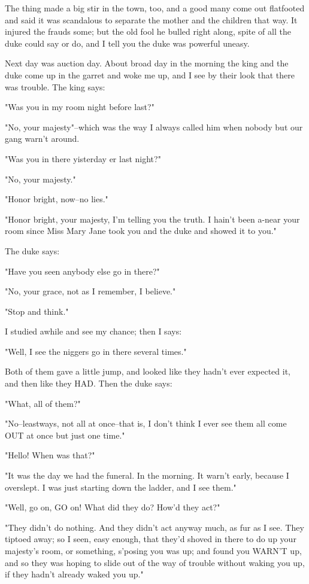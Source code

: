 The thing made a big stir in the town, too, and a good many come out
flatfooted and said it was scandalous to separate the mother and the
children that way.  It injured the frauds some; but the old fool he
bulled right along, spite of all the duke could say or do, and I tell you
the duke was powerful uneasy.

Next day was auction day.  About broad day in the morning the king and
the duke come up in the garret and woke me up, and I see by their look
that there was trouble.  The king says:

"Was you in my room night before last?"

"No, your majesty"--which was the way I always called him when nobody but
our gang warn't around.

"Was you in there yisterday er last night?"

"No, your majesty."

"Honor bright, now--no lies."

"Honor bright, your majesty, I'm telling you the truth.  I hain't been
a-near your room since Miss Mary Jane took you and the duke and showed it
to you."

The duke says:

"Have you seen anybody else go in there?"

"No, your grace, not as I remember, I believe."

"Stop and think."

I studied awhile and see my chance; then I says:

"Well, I see the niggers go in there several times."

Both of them gave a little jump, and looked like they hadn't ever
expected it, and then like they HAD.  Then the duke says:

"What, all of them?"

"No--leastways, not all at once--that is, I don't think I ever see them
all come OUT at once but just one time."

"Hello!  When was that?"

"It was the day we had the funeral.  In the morning.  It warn't early,
because I overslept.  I was just starting down the ladder, and I see
them."

"Well, go on, GO on!  What did they do?  How'd they act?"

"They didn't do nothing.  And they didn't act anyway much, as fur as I
see. They tiptoed away; so I seen, easy enough, that they'd shoved in
there to do up your majesty's room, or something, s'posing you was up;
and found you WARN'T up, and so they was hoping to slide out of the way
of trouble without waking you up, if they hadn't already waked you up."

